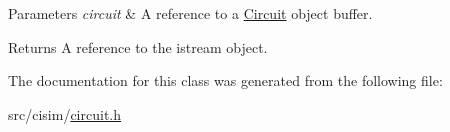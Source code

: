 \begin{DoxyParams}{Parameters}
{\em circuit} & A reference to a \hyperlink{classcisim_1_1_circuit}{Circuit} object buffer. \\
\hline
\end{DoxyParams}
\begin{DoxyReturn}{Returns}
A reference to the istream object. 
\end{DoxyReturn}


The documentation for this class was generated from the following file\+:\begin{DoxyCompactItemize}
\item 
src/cisim/\hyperlink{circuit_8h}{circuit.\+h}\end{DoxyCompactItemize}
